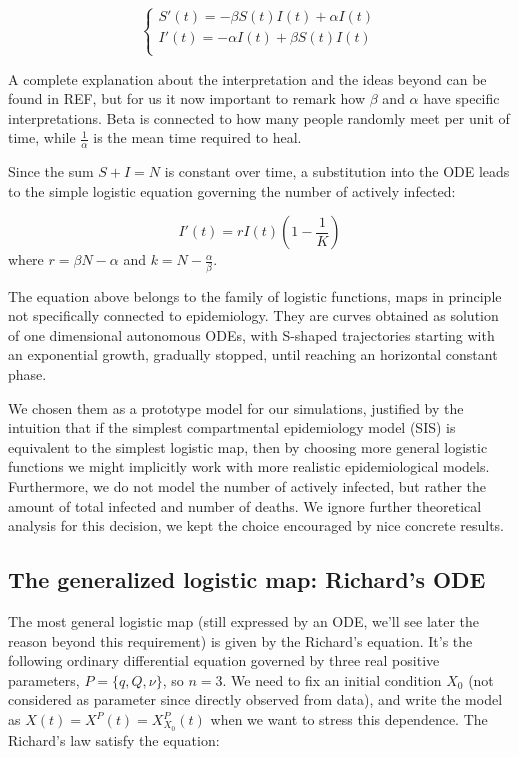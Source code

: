 \documentclass[8pt]{article}
\begin{document}
\begin{equation}
\begin{cases}
	S'(t) = - \beta S(t) I(t) + \alpha I(t) \\
	I'(t) = - \alpha I(t) + \beta S(t) I(t) \\
\end{cases}
\end{equation}


A complete explanation about the interpretation and the ideas beyond can be
found in REF, but for us it now important to remark how $\beta$ and $\alpha$
have specific interpretations. Beta is connected to how many 
people randomly meet per unit of time,
while $\frac{1}{\alpha}$ is the mean time required to heal. 


Since the sum $S + I = N$ is constant over time, a substitution
into the ODE leads to the simple logistic equation governing the number of
actively infected:

\begin{equation}
	I' (t) = r I(t) \left (1 - \frac{1}{K} \right)
\end{equation}
where $r = \beta N - \alpha$ and $k = N - \frac{\alpha}{\beta}$.


The equation above belongs to the family of logistic functions, maps
in principle not specifically connected to epidemiology. They are curves
obtained as solution of one dimensional
autonomous ODEs, with S-shaped trajectories starting with an exponential
growth, gradually stopped, until reaching an horizontal constant phase.


We chosen them as a prototype model for our simulations,
justified by the intuition that if the simplest compartmental
epidemiology model (SIS) is equivalent to the simplest logistic map,
then by choosing more general logistic functions we might implicitly
work with more realistic epidemiological models.
Furthermore, we do not model the number of actively infected,
but rather the amount of total infected and number of deaths.
We ignore further theoretical analysis for this decision,
we kept the choice encouraged by nice concrete results.

\subsection {The generalized logistic map: Richard's ODE}
The most general logistic map (still expressed by an ODE,
 we'll see later the reason beyond this requirement)
is given by the Richard's equation.
It's the following ordinary differential equation governed by
three real positive parameters, 
$P = \{ q, Q, \nu \}$, so $n = 3$. We need to fix an initial condition $X_0$
(not considered as parameter since directly observed from data),
and write the model as $X(t) = X^P(t) = X^P_{X_0}(t)$
when we want to stress this dependence.
The Richard's law satisfy the equation:
\end{document}

